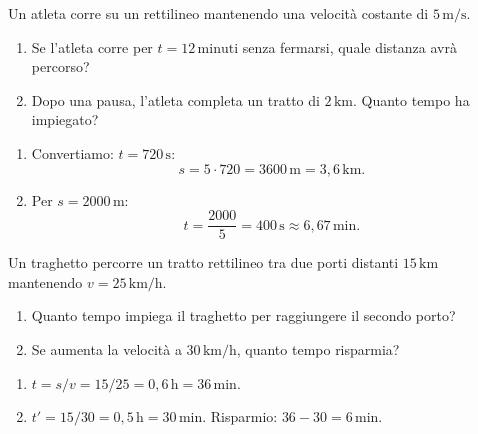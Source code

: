 
\begin{question}[ID=1.4, subtitle={Atleta a velocità costante di 5 m/s}, tags={mru, legge oraria}, difficulty=facile]
Un atleta corre su un rettilineo mantenendo una velocità costante di $5 \, \text{m/s}$.
\begin{enumerate}
    \item Se l'atleta corre per $t = 12 \, \text{minuti}$ senza fermarsi, quale distanza avrà percorso?
    \item Dopo una pausa, l'atleta completa un tratto di $2 \, \text{km}$. Quanto tempo ha impiegato?
\end{enumerate}
\begin{solution}
    \begin{enumerate}
        \item Convertiamo: $t = 720 \, \text{s}$:
        \[
        s = 5 \cdot 720 = 3600 \, \text{m} = 3{,}6 \, \text{km}.
        \]
        \item Per $s = 2000 \, \text{m}$:
        \[
        t = \frac{2000}{5} = 400 \, \text{s} \approx 6{,}67 \, \text{min}.
        \]
    \end{enumerate}
\end{solution}
\end{question}


\begin{question}[ID=1.5, subtitle={Traghetto tra due porti}, tags={mru, legge oraria}, difficulty=facile]
Un traghetto percorre un tratto rettilineo tra due porti distanti $15 \, \text{km}$ mantenendo $v = 25 \, \text{km/h}$.
\begin{enumerate}
    \item Quanto tempo impiega il traghetto per raggiungere il secondo porto?
    \item Se aumenta la velocità a $30 \, \text{km/h}$, quanto tempo risparmia?
\end{enumerate}
\begin{solution}
    \begin{enumerate}
        \item $t = s/v = 15/25 = 0{,}6 \, \text{h} = 36 \, \text{min}$.
        \item $t' = 15/30 = 0{,}5 \, \text{h} = 30 \, \text{min}$. Risparmio: $36 - 30 = 6 \, \text{min}$.
    \end{enumerate}
\end{solution}
\end{question}

